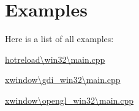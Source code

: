 \section{Examples}
Here is a list of all examples\+:\begin{DoxyCompactItemize}
\item 
\hyperlink{hotreload_0Cwin32_0Cmain_8cpp-example}{hotreload\textbackslash{}win32\textbackslash{}main.\+cpp}
\item 
\hyperlink{xwindow_0Cgdi_win32_0Cmain_8cpp-example}{xwindow\textbackslash{}gdi\+\_\+win32\textbackslash{}main.\+cpp}
\item 
\hyperlink{xwindow_0Copengl_win32_0Cmain_8cpp-example}{xwindow\textbackslash{}opengl\+\_\+win32\textbackslash{}main.\+cpp}
\end{DoxyCompactItemize}
